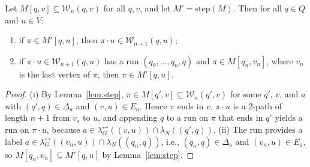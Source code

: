 \begin{lemma}\label{lem:ext}
	Let $M[q, v] \subseteq \mathcal{W}_n(q, v)$ for all $q, v$, and let $M' = \mathrm{step}(M)$. Then for all $q \in Q$ and $u \in V$:
	\begin{enumerate}
		\item[(i)] if $\pi \in M'[q, u]$, then $\pi \cdot u \in \mathcal{W}_{n+1}(q, u)$;
		\item[(ii)] if $\pi \cdot u \in \mathcal{W}_{n+1}(q, u)$ has a run $(q_0, \ldots, q_n, q)$ and $\pi \in M[q_n, v_n]$, where $v_n$ is the last vertex of $\pi$, then $\pi \in M'[q, u]$.
	\end{enumerate}
\end{lemma}
\begin{proof}
	(i) By Lemma~\ref{lem:step}, $\pi \in M[q', v] \subseteq \mathcal{W}_n(q', v)$ for some $q'$, $v$, and $a$ with $(q', q) \in \Delta_a$ and $(v, u) \in E_a$.
	Hence $\pi$ ends in $v$, $\pi \cdot u$ is a 2-path of length $n+1$ from $v_s$ to $u$, and appending $q$ to a run on $\pi$ that ends in $q'$ yields a run on $\pi \cdot u$, because $a \in \lambda_G^\leftrightarrow((v, u)) \cap \lambda_N((q', q))$.
	(ii) The run provides a label $a \in \lambda_G^\leftrightarrow((v_n, u)) \cap \lambda_N((q_n, q))$, i.e., $(q_n, q) \in \Delta_a$ and $(v_n, u) \in E_a$, so $M[q_n, v_n] \subseteq M'[q, u]$ by Lemma~\ref{lem:step}.
\end{proof}

